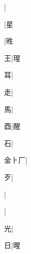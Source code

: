 \begin{multicols}{2}
{{\cjk{}{\cnsym{}　}{\cnsym{}　}{\cnsym{}　}}|{}\par
{\cjk{}{\cnsym{}　}{\cnsym{}　}{\cnsym{}　}}|{\cjk{}星}\par
{\cjk{}{\cnsym{}　}{\cnsym{}　}{\cnsym{}　}}|{\cjk{}甠}\par
{\cjk{}{\cnsym{}　}{\cnsym{}　}王}|{\cjk{}瑆}\par
{\cjk{}{\cnsym{}　}{\cnsym{}　}耳}|{}\par
{\cjk{}{\cnsym{}　}{\cnsym{}　}走}|{}\par
{\cjk{}{\cnsym{}　}{\cnsym{}　}馬}|{}\par
{\cjk{}{\cnsym{}　}{\cnsym{}　}酉}|{\cjk{}醒}\par
{\cjk{}{\cnsym{}　}{\cnsym{}　}石}|{}\par
{\cjk{}金{\cnrtwo{}⺊}厂}|{}\par
{\cjk{}{\cnsym{}　}{\cnsym{}　}歹}|{}\par
{}|{}\par
{}|{}\par
{\cjk{}{\cnsym{}　}{\cnsym{}　}光}|{}\par
{\cjk{}{\cnsym{}　}{\cnsym{}　}日}|{\cjk{}暒}\par
}
\end{multicols}
